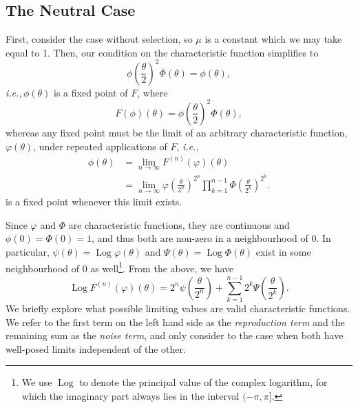 \documentclass{article}
\newcommand{\ie}{\textit{i.e.,}\,}
\newcommand{\1}{\mathbbm{1}}
\DeclareMathOperator*{\Log}{Log}
\theoremstyle{remark}
\theoremstyle{definition}
\begin{document}
\subsection{The Neutral Case}

First, consider the case without selection, so $\mu$ is a constant
which we may take equal to 1.  Then, our condition on the characteristic function simplifies to
\begin{equation}\label{eq:CF_neutral}
	{\textstyle \phi\left(\frac{\theta}{2}\right)^{2}} \Phi(\theta) %
	= \phi(\theta) ,
\end{equation}
\ie $\phi(\theta)$ is a fixed point of $F$, where
 \[
	F(\phi)(\theta) = {\textstyle \phi\left(\frac{\theta}{2}\right)^{2}} \Phi(\theta),
\]
whereas any fixed point must be the limit of an arbitrary characteristic function, $\varphi(\theta)$, under repeated applications of $F$,
\ie {}
\begin{align*}
	\phi(\theta) 
    &= \lim_{n \to \infty} F^{(n)}(\varphi)(\theta) \\
    &= \lim_{n \to \infty} \varphi\left(\frac{\theta}{2^{n}}\right)^{2^{n}}\prod_{k=1}^{n-1}\Phi\left(\frac{\theta}{2^{k}}\right)^{2^{k}} .
\end{align*}
is a fixed point whenever this limit exists.  

Since $\varphi$ and $\Phi$ are characteristic functions, they are continuous and $\phi(0) = \Phi(0) = 1$, and thus both are non-zero in a neighbourhood of 0. In particular, $\psi(\theta) = \Log{\varphi}(\theta)$ and $\Psi(\theta) = \Log{\Phi(\theta)}$ exist in some neighbourhood of 0 as well\footnote{We use $\Log$ to denote the principal value of the complex logarithm, for which the imaginary part always lies in the interval $(-\pi,\pi]$.}.  From the above, we have
\[
	\Log{F^{(n)}(\varphi)(\theta)} = {\textstyle 2^{n} \psi\left(\frac{\theta}{2^{n}}\right)} 
		+ \sum_{k=1}^{n-1}  {\textstyle 2^{k} \Psi\left(\frac{\theta}{2^{k}}\right)}.
\]
We briefly explore what possible limiting values are valid characteristic functions.  We refer to the first term on the left hand side as the \emph{reproduction term} and the remaining sum as the \emph{noise term}, and only consider to the case when both have well-posed limits independent of the other. 
\end{document}
